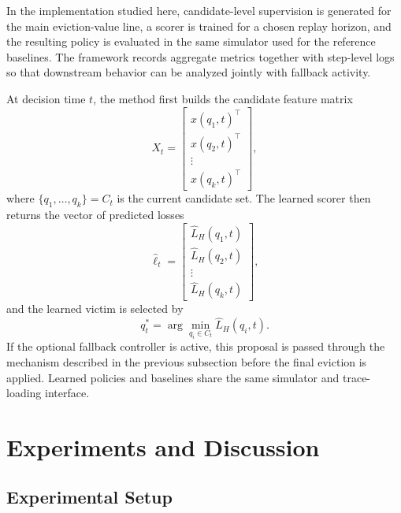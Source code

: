 \documentclass[preprint,12pt]{elsarticle}
\begin{document}
In the implementation studied here, candidate-level supervision is generated for the main eviction-value line, a scorer is trained for a chosen replay horizon, and the resulting policy is evaluated in the same simulator used for the reference baselines. The framework records aggregate metrics together with step-level logs so that downstream behavior can be analyzed jointly with fallback activity.

At decision time $t$, the method first builds the candidate feature matrix
\begin{equation}
X_t =
\begin{bmatrix}
x(q_1,t)^{\top}\\
x(q_2,t)^{\top}\\
\vdots\\
x(q_k,t)^{\top}
\end{bmatrix},
\label{eq:candidate_feature_matrix}
\end{equation}
where $\{q_1,\ldots,q_k\}=C_t$ is the current candidate set. The learned scorer then returns the vector of predicted losses
\begin{equation}
\widehat{\ell}_t =
\begin{bmatrix}
\widehat{L}_H(q_1,t)\\
\widehat{L}_H(q_2,t)\\
\vdots\\
\widehat{L}_H(q_k,t)
\end{bmatrix},
\label{eq:predicted_loss_vector}
\end{equation}
and the learned victim is selected by
\begin{equation}
q_t^{*} = \arg\min_{q_i \in C_t} \widehat{L}_H(q_i,t).
\label{eq:workflow_argmin}
\end{equation}
If the optional fallback controller is active, this proposal is passed through the mechanism described in the previous subsection before the final eviction is applied. Learned policies and baselines share the same simulator and trace-loading interface.

\section{Experiments and Discussion}
\label{sec:experiments}


\subsection{Experimental Setup}
\label{subsec:experimental_setup}
\end{document}

